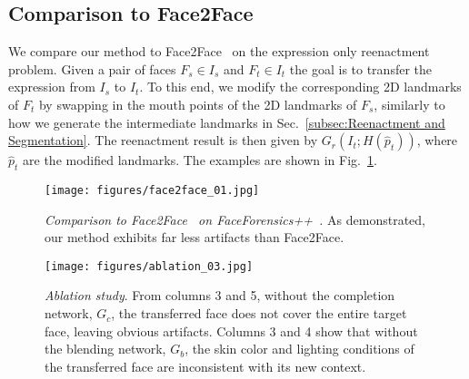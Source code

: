 \subsection{Comparison to Face2Face}
We compare our method to Face2Face~\cite{thies2016face2face} on the expression only reenactment problem. Given a pair of faces $F_s \in I_s$ and $F_t \in I_t$ the goal is to transfer the expression from $I_s$ to $I_t$. To this end, we modify the corresponding 2D landmarks of $F_t$ by swapping in the mouth points of the 2D landmarks of $F_s$, similarly to how we generate the intermediate landmarks in Sec.~\ref{subsec:Reenactment and Segmentation}. The reenactment result is then given by $G_r(I_t;H(\hat{p}_t))$, where $\hat{p}_t$ are the modified landmarks. The examples are shown in Fig.~\ref{fig:face2face}.

\begin{figure}[t]
\centering
\texttt{[image: figures/face2face\_01.jpg]}
\caption{ \emph{Comparison to Face2Face~\cite{thies2016face2face} on FaceForensics++~\cite{roessler2019faceforensics++}.} As demonstrated, our method exhibits far less artifacts than Face2Face. \vspace{-4mm} }%
\label{fig:face2face}%
\end{figure}

\begin{figure*}[!htbp]
\centering
\texttt{[image: figures/ablation\_03.jpg]}\vspace{-2mm}
\caption{\emph{Ablation study}. From columns 3 and 5, without the completion network, $G_c$, the transferred face does not cover the entire target face, leaving obvious artifacts. Columns 3 and 4 show that without the blending network, $G_b$, the skin color and lighting conditions of the transferred face are inconsistent with its new context.}%
\vspace{-4mm}
\label{fig:ablation_qualitative}%
\end{figure*}

